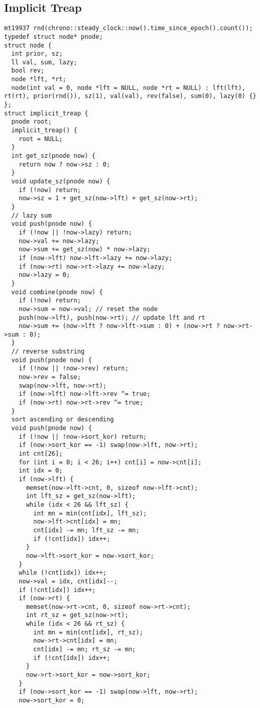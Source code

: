 \documentclass[10pt,a4paper,onesided]{article}
\begin{document}
\begin{multicols*}{3}
\subsection{Implicit Treap}
\begin{lstlisting}
mt19937 rnd(chrono::steady_clock::now().time_since_epoch().count());
typedef struct node* pnode;
struct node {
  int prior, sz;
  ll val, sum, lazy;
  bool rev;
  node *lft, *rt;
  node(int val = 0, node *lft = NULL, node *rt = NULL) : lft(lft), rt(rt), prior(rnd()), sz(1), val(val), rev(false), sum(0), lazy(0) {}
};
struct implicit_treap {
  pnode root;
  implicit_treap() {
    root = NULL;
  }
  int get_sz(pnode now) {
    return now ? now->sz : 0;
  }
  void update_sz(pnode now) {
    if (!now) return;
    now->sz = 1 + get_sz(now->lft) + get_sz(now->rt);
  }
  // lazy sum
  void push(pnode now) {
    if (!now || !now->lazy) return;
    now->val += now->lazy;
    now->sum += get_sz(now) * now->lazy;
    if (now->lft) now->lft->lazy += now->lazy;
    if (now->rt) now->rt->lazy += now->lazy;
    now->lazy = 0;
  }
  void combine(pnode now) {
    if (!now) return;
    now->sum = now->val; // reset the node
    push(now->lft), push(now->rt); // update lft and rt
    now->sum += (now->lft ? now->lft->sum : 0) + (now->rt ? now->rt->sum : 0);
  }
  // reverse substring
  void push(pnode now) {
    if (!now || !now->rev) return;
    now->rev = false;
    swap(now->lft, now->rt);
    if (now->lft) now->lft->rev ^= true;
    if (now->rt) now->rt->rev ^= true;
  }
  sort ascending or descending
  void push(pnode now) {
    if (!now || !now->sort_kor) return;
    if (now->sort_kor == -1) swap(now->lft, now->rt);
    int cnt[26];
    for (int i = 0; i < 26; i++) cnt[i] = now->cnt[i];
    int idx = 0;
    if (now->lft) {
      memset(now->lft->cnt, 0, sizeof now->lft->cnt);
      int lft_sz = get_sz(now->lft);
      while (idx < 26 && lft_sz) {
        int mn = min(cnt[idx], lft_sz);
        now->lft->cnt[idx] = mn;
        cnt[idx] -= mn; lft_sz -= mn;
        if (!cnt[idx]) idx++;
      }
      now->lft->sort_kor = now->sort_kor;
    }
    while (!cnt[idx]) idx++;
    now->val = idx, cnt[idx]--;
    if (!cnt[idx]) idx++;
    if (now->rt) {
      memset(now->rt->cnt, 0, sizeof now->rt->cnt);
      int rt_sz = get_sz(now->rt);
      while (idx < 26 && rt_sz) {
        int mn = min(cnt[idx], rt_sz);
        now->rt->cnt[idx] = mn;
        cnt[idx] -= mn; rt_sz -= mn;
        if (!cnt[idx]) idx++;
      }
      now->rt->sort_kor = now->sort_kor;
    }
    if (now->sort_kor == -1) swap(now->lft, now->rt);
    now->sort_kor = 0;

\end{lstlisting}
\end{multicols*}
\end{document}
